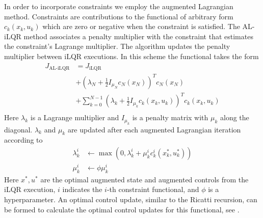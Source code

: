 In order to incorporate constraints we employ
the augmented Lagrangian method. Constraints are contributions
to the functional of arbitrary form $c_{k}(x_{k}, u_{k})$ which are
zero or negative when the constraint is satisfied. The AL-iLQR
method associates a penalty multiplier with the constraint
that estimates the constraint's Lagrange multiplier.
The algorithm updates the penalty multiplier between
iLQR executions. In this scheme the functional takes the form
\begin{equation}
\begin{aligned}
    J_{\textrm{AL-iLQR}} &= J_{\textrm{iLQR}}\\
    &+ (\lambda_{N} + \frac{1}{2}I_{\mu_{N}} c_{N}(x_{N}))^{T} c_{N}(x_{N})\\
    &+ \sum^{N - 1}_{k = 0} (\lambda_{k} + \frac{1}{2}I_{\mu_{k}} c_{k}(x_{k}, u_{k}))^{T} c_{k}(x_{k}, u_{k})\\
\end{aligned}
\end{equation}
Here $\lambda_{k}$ is a Lagrange multiplier and $I_{\mu_{k}}$ is a penalty matrix
with $\mu_{k}$ along the diagonal.
$\lambda_{k}$ and $\mu_{k}$ are updated after each augmented Lagrangian iteration according to
\begin{align}
  \lambda^{i}_{k} &\gets \max(0, \lambda^{i}_{k} + \mu^{i}_{k} c^{i}_{k}(x_{k}^{*}, u_{k}^{*}))\\
  \mu^{i}_{k} &\gets \phi \mu^{i}_{k}
\end{align}
Here $x^{*}, u^{*}$ are the optimal augmented state and augmented controls from the iLQR execution,
$i$ indicates the $i$-th constraint functional,
and $\phi$ is a hyperparameter. An optimal control update, similar to the Ricatti
recursion, can be formed to calculate the optimal control updates for this functional,
see \cite{howell2019altro}.
